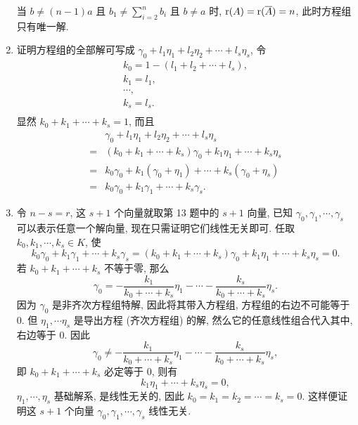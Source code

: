 \begin{enumerate}
        当 $b \ne (n-1)a$ 且 $b_1 \ne \sum_{i=2}^nb_i$ 且 $b \ne a$ 时, $\mathrm{r}(A) = \mathrm{r}(\overline{A}) = n$, 此时方程组只有唯一解.
    \item %
        {\heiti 证明}\quad 方程组的全部解可写成 $\gamma_0 + l_1\eta_1 + l_2\eta_2 + \cdots + l_s\eta_s$, 令
        \begin{gather*}
            k_0 = 1 - (l_1 + l_2 + \cdots + l_s), \\
            k_1 = l_1, \\
            \cdots, \\
            k_s = l_s. \\
        \end{gather*}
        显然 $k_0 + k_1 + \cdots + k_s = 1$, 而且
        \begin{align*}
            & \gamma_0 + l_1\eta_1 + l_2\eta_2 + \cdots + l_s\eta_s \\
            ={} & (k_0 + k_1 + \cdots + k_s)\gamma_0 + k_1\eta_1 + \cdots + k_s\eta_s \\
            ={} & k_0\gamma_0 + k_1(\gamma_0 + \eta_1) + \cdots + k_s(\gamma_0 + \eta_s) \\
            ={} & k_0\gamma_0 + k_1\gamma_1 + \cdots + k_s\gamma_s.   
        \end{align*}
    \item %
        令 $n - s = r$, 这 $s + 1$ 个向量就取第 13 题中的 $s + 1$ 向量, 已知 $\gamma_0, \gamma_1, \cdots, \gamma_s$ 可以表示任意一个解向量, 现在只需证明它们线性无关即可.
        任取 $k_0, k_1, \cdots, k_s \in K$, 使
        \[
            k_0\gamma_0 + k_1\gamma_1 + \cdots + k_s\gamma_s
            =(k_0 + k_1 + \cdots + k_s)\gamma_0 + k_1\eta_1 + \cdots + k_s\eta_s = 0.
        \]
        若 $k_0 + k_1 + \cdots + k_s$ 不等于零, 那么
        \[
            \gamma_0 = -\frac{k_1}{k_0 + \cdots + k_s}\eta_1 - \cdots - \frac{k_s}{k_0 + \cdots + k_s}\eta_s.    
        \] 
        因为 $\gamma_0$ 是非齐次方程组特解, 因此将其带入方程组, 方程组的右边不可能等于 $0$.
        但 $\eta_1, \cdots \eta_s$ 是导出方程 (齐次方程组) 的解, 然么它的任意线性组合代入其中, 右边等于 $0$.
        因此
        \[
            \gamma_0 \ne -\frac{k_1}{k_0 + \cdots + k_s}\eta_1 - \cdots - \frac{k_s}{k_0 + \cdots + k_s}\eta_s,   
        \]
        即 $k_0 + k_1 + \cdots + k_s$ 必定等于 $0$, 则有
        \[
            k_1\eta_1 + \cdots + k_s\eta_s = 0,   
        \]
        $\eta_1, \cdots, \eta_s$ 基础解系, 是线性无关的, 因此 $k_0 = k_1 = k_2 = \cdots = k_s = 0$.
        这样便证明这 $s + 1$ 个向量 $\gamma_0, \gamma_1, \cdots, \gamma_s$ 线性无关.

\end{enumerate}
